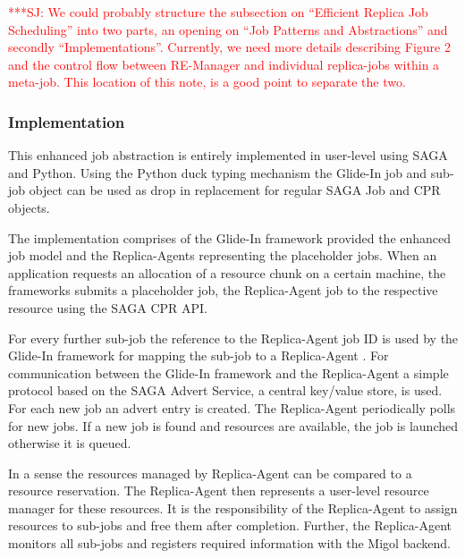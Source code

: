 \documentclass{rspublic}
\newcommand{\jhanote}[1]{ {\textcolor{red} { ***SJ: #1 }}}
\newcommand{\jhanote}[1]{}
\newcommand{\glidein}[1]{Glide-In }
\newcommand{\replicaagent}[1]{Replica-Agent }
\newcommand{\remanager}[1]{RE-Manager }
\begin{document}
\jhanote{We could probably structure the subsection on ``Efficient
  Replica Job Scheduling'' into two parts, an opening on ``Job
  Patterns and Abstractions'' and secondly
  ``Implementations''. Currently, we need more details describing
  Figure 2 and the control flow between \remanager\ and individual
  replica-jobs within a meta-job. This location of this note, is a
  good point to separate the two.}   
  
  
\subsubsection{Implementation}         
 
This enhanced job abstraction is entirely implemented in user-level 
using SAGA and Python. Using the Python duck typing mechanism the 
\glidein\ job and sub-job object can 
be used as drop in replacement for regular SAGA Job and CPR objects.
                                                          
The implementation comprises of the \glidein\ framework provided the 
enhanced job model and the Replica-Agents
representing the placeholder jobs. When an application requests an 
allocation of a resource chunk on a certain machine, the frameworks submits a
placeholder job, the \replicaagent\ job to the respective resource
using the SAGA CPR API. 

For every further sub-job the reference to the \replicaagent\ job ID 
is used by the \glidein\ framework for mapping
the sub-job to a \replicaagent\ .  For communication between the \glidein\ framework
and the \replicaagent\ a simple protocol based on the SAGA
Advert Service, a central key/value store, is used.  For each new job an advert
entry is created. The \replicaagent\ periodically polls for new jobs.
If a new job is found and resources are available, the job is launched
otherwise it is queued.
           
In a sense the resources managed by \replicaagent\ can be compared to 
a resource reservation. The Replica-Agent then represents 
a user-level resource manager 
for these resources. It is the responsibility of the \replicaagent\ 
to assign resources to sub-jobs and free them after completion. Further,
the \replicaagent\ monitors all sub-jobs and registers required
information with the Migol backend.
\end{document}
